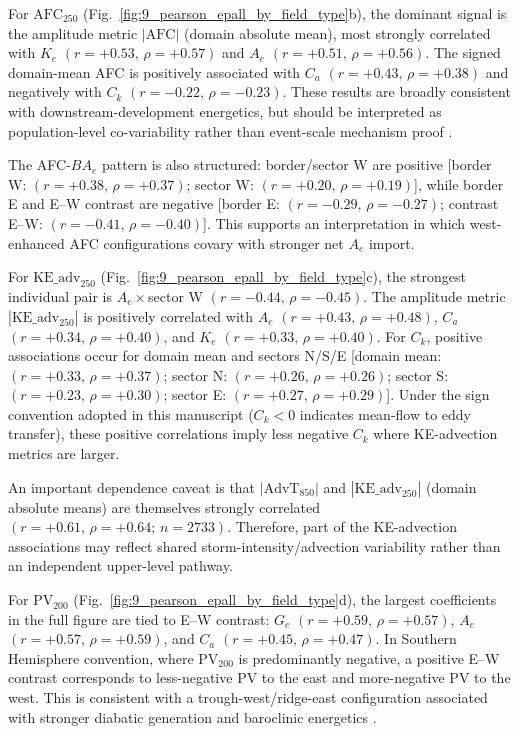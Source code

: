 For $\mathrm{AFC}_{250}$ (Fig.~\ref{fig:9_pearson_epall_by_field_type}b), the dominant signal is the amplitude metric $|\mathrm{AFC}|$ (domain absolute mean), most strongly correlated with $K_e$ $(r=+0.53,\,\rho=+0.57)$ and $A_e$ $(r=+0.51,\,\rho=+0.56)$. The signed domain-mean AFC is positively associated with $C_a$ $(r=+0.43,\,\rho=+0.38)$ and negatively with $C_k$ $(r=-0.22,\,\rho=-0.23)$. These results are broadly consistent with downstream-development energetics, but should be interpreted as population-level co-variability rather than event-scale mechanism proof \citep{orlanski1991life,orlanski1993ageostrophic}.

The AFC-$BA_e$ pattern is also structured: border/sector W are positive [border W: $(r=+0.38,\,\rho=+0.37)$; sector W: $(r=+0.20,\,\rho=+0.19)$], while border E and E--W contrast are negative [border E: $(r=-0.29,\,\rho=-0.27)$; contrast E--W: $(r=-0.41,\,\rho=-0.40)$]. This supports an interpretation in which west-enhanced AFC configurations covary with stronger net $A_e$ import.

For $\mathrm{KE\_adv}_{250}$ (Fig.~\ref{fig:9_pearson_epall_by_field_type}c), the strongest individual pair is $A_e\times$sector W $(r=-0.44,\,\rho=-0.45)$. The amplitude metric $|\mathrm{KE\_adv}_{250}|$ is positively correlated with $A_e$ $(r=+0.43,\,\rho=+0.48)$, $C_a$ $(r=+0.34,\,\rho=+0.40)$, and $K_e$ $(r=+0.33,\,\rho=+0.40)$. For $C_k$, positive associations occur for domain mean and sectors N/S/E [domain mean: $(r=+0.33,\,\rho=+0.37)$; sector N: $(r=+0.26,\,\rho=+0.26)$; sector S: $(r=+0.23,\,\rho=+0.30)$; sector E: $(r=+0.27,\,\rho=+0.29)$]. Under the sign convention adopted in this manuscript ($C_k<0$ indicates mean-flow to eddy transfer), these positive correlations imply less negative $C_k$ where KE-advection metrics are larger.

An important dependence caveat is that $|\mathrm{AdvT}_{850}|$ and $|\mathrm{KE\_adv}_{250}|$ (domain absolute means) are themselves strongly correlated $(r=+0.61,\,\rho=+0.64;\,n=2733)$. Therefore, part of the KE-advection associations may reflect shared storm-intensity/advection variability rather than an independent upper-level pathway.

For $\mathrm{PV}_{200}$ (Fig.~\ref{fig:9_pearson_epall_by_field_type}d), the largest coefficients in the full figure are tied to E--W contrast: $G_e$ $(r=+0.59,\,\rho=+0.57)$, $A_e$ $(r=+0.57,\,\rho=+0.59)$, and $C_a$ $(r=+0.45,\,\rho=+0.47)$. In Southern Hemisphere convention, where $\mathrm{PV}_{200}$ is predominantly negative, a positive E--W contrast corresponds to less-negative PV to the east and more-negative PV to the west. This is consistent with a trough-west/ridge-east configuration associated with stronger diabatic generation and baroclinic energetics \citep{hoskins1985use,davis1991potential}.

